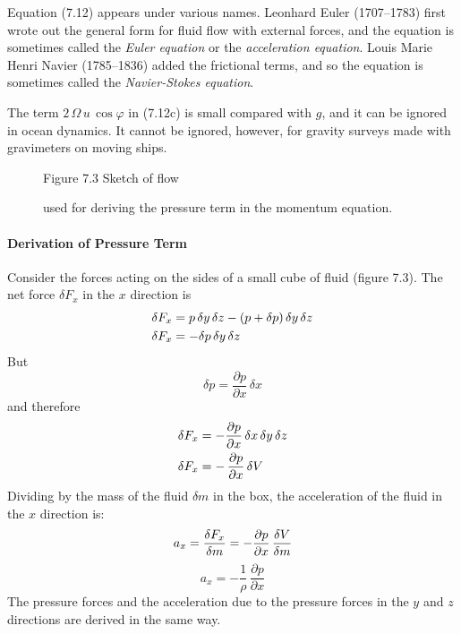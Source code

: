 Equation (7.12) appears under various names. Leonhard Euler (1707--1783) first wrote out the general form for fluid
flow with external forces, and the equation is sometimes called the \textit{Euler equation} or
the \textit{acceleration equation}. Louis Marie Henri Navier (1785--1836) added the
frictional terms, and so the equation is sometimes called the \textit{Navier-Stokes equation}.

The term $2\,\Omega\,u\, \cos{\varphi}$ in (7.12c) is small compared with $g$,
and it can be ignored in ocean dynamics. It cannot be ignored, however, for
gravity surveys made with gravimeters on moving ships.

\begin{figure}[h!]
\centering
\footnotesize
Figure 7.3 Sketch of flow \rule{0mm}{3ex}used for deriving the
pressure term in the momentum equation.

\label{fig:pressuresketch}
\vspace{-3ex}
\end{figure}

\paragraph{Derivation of Pressure Term}
Consider the forces acting on the sides of a small cube of fluid (figure 7.3).
The net force $\delta F_x$ in the $x$ direction is
\begin{align}
\delta F_x &= p\,\delta{y}\,\delta{z} - (p + \delta{p})\,\delta{y}\,\delta{z}
\notag \\
\delta F_x &= - \delta{p}\,\delta{y}\,\delta{z} \notag
\end{align}
But
\begin{displaymath}
\delta{p} = \frac{\partial{p}}{\partial{x}}\,\delta{x}
\end{displaymath}
and therefore
\begin{align}
\delta F_x &= - \frac{\partial{p}}{\partial{x}}\,\delta{x}\,\delta{y}\,\delta{z}
\notag \\
\delta F_x &=-\,\frac{\partial{p}}{\partial{x}}\, \delta{V} \notag
\end{align}
Dividing by the mass of the fluid $\delta m$ in the box, the acceleration of
the fluid in the $x$ direction is:
\begin{equation}
a_x = \frac{{\delta F_x}}{\delta{m}} = - \frac{\partial{p}}{\partial{x}}\,
\frac{\delta{V}}{\delta{m}} \notag
\end{equation}
\begin{equation}
\boxed{a_x = - \frac{1}{\rho}\,\frac{\partial{p}}{\partial{x}}}
\end{equation}
The pressure forces and the acceleration due to the pressure forces in the $y$
and
$z$ directions are derived in the same way.

